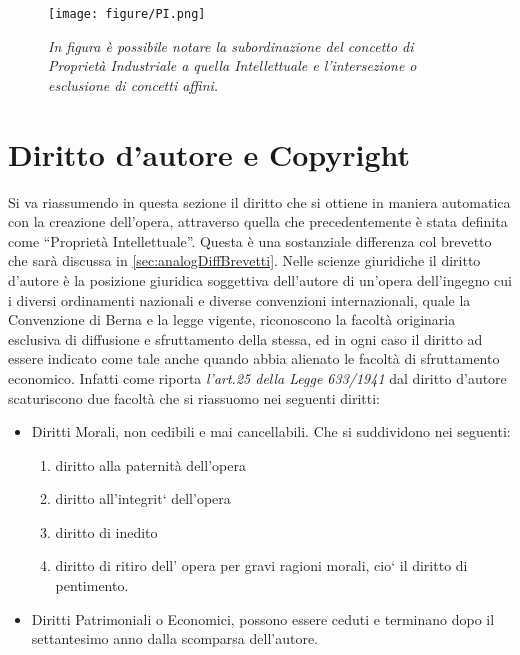 \begin{figure}[bh]
	\begin{center}
		\texttt{[image: figure/PI.png]}
	\end{center}
	\caption{\textit{In figura è possibile notare la subordinazione del concetto di Proprietà Industriale a quella Intellettuale e l'intersezione o esclusione di concetti affini.}}
\end{figure}



\section{Diritto d'autore e Copyright}
Si va riassumendo in questa sezione il diritto che si ottiene in maniera automatica con la creazione dell'opera, attraverso quella che precedentemente è stata definita come ``Proprietà Intellettuale''. Questa è una sostanziale differenza col brevetto che sarà discussa in \ref{sec:analogDiffBrevetti}.
Nelle scienze giuridiche il diritto d'autore è la posizione giuridica soggettiva dell'autore di un'opera dell'ingegno cui i diversi ordinamenti nazionali e diverse convenzioni internazionali, quale la Convenzione di Berna e la legge vigente, riconoscono la facoltà originaria esclusiva di diffusione e sfruttamento della stessa, ed in ogni caso il diritto ad essere indicato come tale anche quando abbia alienato le facoltà di sfruttamento economico.
Infatti come riporta \textit{l'art.25 della Legge 633/1941} dal diritto d'autore scaturiscono due facoltà che si riassuomo nei seguenti diritti:
\begin{itemize}
 \item Diritti Morali, non cedibili e mai cancellabili. Che si suddividono nei seguenti:

\begin{enumerate}
\item diritto alla paternità dell’opera
\item diritto all’integrit` dell’opera
\item diritto di inedito
\item diritto di ritiro dell’ opera per gravi ragioni morali, cio` il diritto di pentimento.
\end{enumerate}

 \item Diritti Patrimoniali o Economici, possono essere ceduti e terminano dopo il settantesimo anno dalla scomparsa dell'autore.
\end{itemize}


